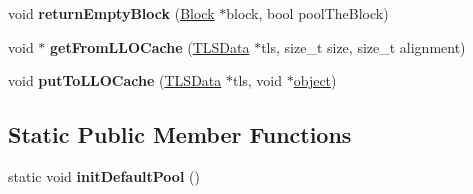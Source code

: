 \begin{DoxyCompactItemize}
\item 
\hypertarget{classrml_1_1internal_1_1MemoryPool_a7a5bf7ebdfc09d422f7862d8d4063795}{}void {\bfseries return\+Empty\+Block} (\hyperlink{classrml_1_1internal_1_1Block}{Block} $\ast$block, bool pool\+The\+Block)\label{classrml_1_1internal_1_1MemoryPool_a7a5bf7ebdfc09d422f7862d8d4063795}

\item 
\hypertarget{classrml_1_1internal_1_1MemoryPool_af1f6175add16b2b950447b8b4c6bf491}{}void $\ast$ {\bfseries get\+From\+L\+L\+O\+Cache} (\hyperlink{classrml_1_1internal_1_1TLSData}{T\+L\+S\+Data} $\ast$tls, size\+\_\+t size, size\+\_\+t alignment)\label{classrml_1_1internal_1_1MemoryPool_af1f6175add16b2b950447b8b4c6bf491}

\item 
\hypertarget{classrml_1_1internal_1_1MemoryPool_aedf33ac6b570a3847f86ad528de00149}{}void {\bfseries put\+To\+L\+L\+O\+Cache} (\hyperlink{classrml_1_1internal_1_1TLSData}{T\+L\+S\+Data} $\ast$tls, void $\ast$\hyperlink{structobject}{object})\label{classrml_1_1internal_1_1MemoryPool_aedf33ac6b570a3847f86ad528de00149}

\end{DoxyCompactItemize}
\subsection*{Static Public Member Functions}
\begin{DoxyCompactItemize}
\item 
\hypertarget{classrml_1_1internal_1_1MemoryPool_add7381e97285946d931d763e07dee7e5}{}static void {\bfseries init\+Default\+Pool} ()\label{classrml_1_1internal_1_1MemoryPool_add7381e97285946d931d763e07dee7e5}

\end{DoxyCompactItemize}
